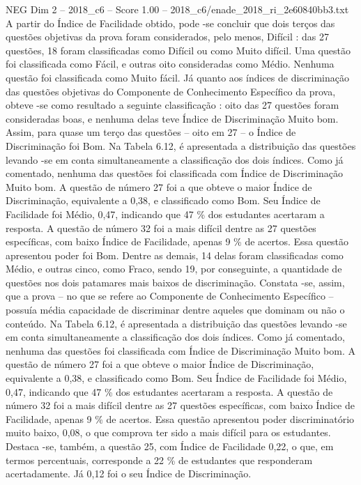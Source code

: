 \begin{textsample}{NEG Dim 2 – 2018\_c6 – Score 1.00 – 2018\_c6/enade\_2018\_ri\_2e60840bb3.txt}
A partir do Índice de Facilidade obtido, pode -se concluir que dois terços das questões objetivas da prova foram considerados, pelo menos, Difícil : das 27 questões, 18 foram classificadas como Difícil ou como Muito difícil.
Uma questão foi classificada como Fácil, e outras oito consideradas como Médio.
Nenhuma questão foi classificada como Muito fácil.
Já quanto aos índices de discriminação das questões objetivas do Componente de Conhecimento Específico da prova, obteve -se como resultado a seguinte classificação : oito das 27 questões foram consideradas boas, e nenhuma delas teve Índice de Discriminação Muito bom.
Assim, para quase um terço das questões – oito em 27 – o Índice de Discriminação foi Bom.
Na Tabela 6.12, é apresentada a distribuição das questões levando -se em conta simultaneamente a classificação dos dois índices.
Como já comentado, nenhuma das questões foi classificada com Índice de Discriminação Muito bom.
A questão de número 27 foi a que obteve o maior Índice de Discriminação, equivalente a 0,38, e classificado como Bom.
Seu Índice de Facilidade foi Médio, 0,47, indicando que 47 \% dos estudantes acertaram a resposta.
A questão de número 32 foi a mais difícil dentre as 27 questões específicas, com baixo Índice de Facilidade, apenas 9 \% de acertos.
Essa questão apresentou poder foi Bom.
Dentre as demais, 14 delas foram classificadas como Médio, e outras cinco, como Fraco, sendo 19, por conseguinte, a quantidade de questões nos dois patamares mais baixos de discriminação.
Constata -se, assim, que a prova – no que se refere ao Componente de Conhecimento Específico – possuía média capacidade de discriminar dentre aqueles que dominam ou não o conteúdo.
Na Tabela 6.12, é apresentada a distribuição das questões levando -se em conta simultaneamente a classificação dos dois índices.
Como já comentado, nenhuma das questões foi classificada com Índice de Discriminação Muito bom.
A questão de número 27 foi a que obteve o maior Índice de Discriminação, equivalente a 0,38, e classificado como Bom.
Seu Índice de Facilidade foi Médio, 0,47, indicando que 47 \% dos estudantes acertaram a resposta.
A questão de número 32 foi a mais difícil dentre as 27 questões específicas, com baixo Índice de Facilidade, apenas 9 \% de acertos.
Essa questão apresentou poder discriminatório muito baixo, 0,08, o que comprova ter sido a mais difícil para os estudantes.
Destaca -se, também, a questão 25, com Índice de Facilidade 0,22, o que, em termos percentuais, corresponde a 22 \% de estudantes que responderam acertadamente.
Já 0,12 foi o seu Índice de Discriminação.

\end{textsample}
